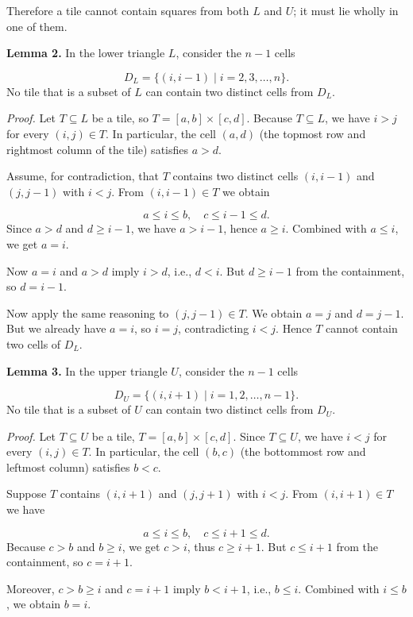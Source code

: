 \documentclass{llmxive}
\begin{document}
Therefore a tile cannot contain squares from both \(L\) and \(U\); it must lie wholly in one of them.\par
\textbf{Lemma 2.} In the lower triangle \(L\), consider the \(n-1\) cells\par
\[
D_L = \{(i,i-1) \mid i = 2,3,\dots,n\}.
\]
No tile that is a subset of \(L\) can contain two distinct cells from \(D_L\).\par
\emph{Proof.} Let \(T \subseteq L\) be a tile, so \(T = [a,b] \times [c,d]\). Because \(T \subseteq L\), we have \(i > j\) for every \((i,j) \in T\). In particular, the cell \((a,d)\) (the topmost row and rightmost column of the tile) satisfies \(a > d\).\par
Assume, for contradiction, that \(T\) contains two distinct cells \((i,i-1)\) and \((j,j-1)\) with \(i < j\). From \((i,i-1) \in T\) we obtain\par
\[
a \le i \le b,\quad c \le i-1 \le d.
\]
Since \(a > d\) and \(d \ge i-1\), we have \(a > i-1\), hence \(a \ge i\). Combined with \(a \le i\), we get \(a = i\).\par
Now \(a = i\) and \(a > d\) imply \(i > d\), i.e., \(d < i\). But \(d \ge i-1\) from the containment, so \(d = i-1\).\par
Now apply the same reasoning to \((j,j-1) \in T\). We obtain \(a = j\) and \(d = j-1\). But we already have \(a = i\), so \(i = j\), contradicting \(i < j\). Hence \(T\) cannot contain two cells of \(D_L\).\par
\textbf{Lemma 3.} In the upper triangle \(U\), consider the \(n-1\) cells\par
\[
D_U = \{(i,i+1) \mid i = 1,2,\dots,n-1\}.
\]
No tile that is a subset of \(U\) can contain two distinct cells from \(D_U\).\par
\emph{Proof.} Let \(T \subseteq U\) be a tile, \(T = [a,b] \times [c,d]\). Since \(T \subseteq U\), we have \(i < j\) for every \((i,j) \in T\). In particular, the cell \((b,c)\) (the bottommost row and leftmost column) satisfies \(b < c\).\par
Suppose \(T\) contains \((i,i+1)\) and \((j,j+1)\) with \(i < j\). From \((i,i+1) \in T\) we have\par
\[
a \le i \le b,\quad c \le i+1 \le d.
\]
Because \(c > b\) and \(b \ge i\), we get \(c > i\), thus \(c \ge i+1\). But \(c \le i+1\) from the containment, so \(c = i+1\).\par
Moreover, \(c > b \ge i\) and \(c = i+1\) imply \(b < i+1\), i.e., \(b \le i\). Combined with \(i \le b\), we obtain \(b = i\).\par
\end{document}
